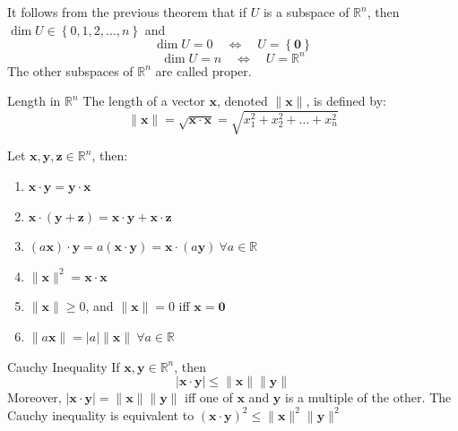 \documentclass[12pt]{article}
\begin{document}
\begin{corollary}{}{}
    It follows from the previous theorem that if $ U $ is a subspace of $ \mathbb{R}^n $, then $ \dim U \in \left\{ 0, 1, 2, \dots, n \right\} $ and
    \[ \dim U = 0 \quad \Longleftrightarrow \quad U = \left\{ \mathbf{0} \right\} \]
    \[ \dim U = n \quad \Longleftrightarrow \quad U = \mathbb{R}^n \]
    The other subspaces of $ \mathbb{R}^n $ are called proper.
\end{corollary}

\begin{definition}{Length in $ \mathbb{R}^n $}{}
    The length of a vector $ \mathbf{x} $, denoted $ \lVert \mathbf{x} \rVert $, is defined by:
    \[ \lVert \mathbf{x} \rVert = \sqrt{\mathbf{x} \cdot \mathbf{x}} = \sqrt{x_1^2 + x_2^2 + \dots + x_n^2 } \]
\end{definition}

\begin{theorem}{}{}
    Let $ \mathbf{x}, \mathbf{y}, \mathbf{z} \in \mathbb{R}^n $, then:
    \begin{enumerate}
        \item $ \mathbf{x} \cdot \mathbf{y} = \mathbf{y} \cdot \mathbf{x} $
        \item $ \mathbf{x} \cdot \left( \mathbf{y} + \mathbf{z} \right) = \mathbf{x} \cdot \mathbf{y} + \mathbf{x} \cdot \mathbf{z} $
        \item $ \left( a \mathbf{x} \right) \cdot \mathbf{y} = a \left( \mathbf{x} \cdot \mathbf{y} \right) = \mathbf{x} \cdot \left( a \mathbf{y} \right) \ \forall a \in \mathbb{R} $
        \item $ \lVert \mathbf{x} \rVert^2 = \mathbf{x} \cdot \mathbf{x} $
        \item $ \lVert \mathbf{x} \rVert \geq 0 $, and $ \lVert \mathbf{x} \rVert = 0 $ iff $ \mathbf{x} = \mathbf{0} $
        \item $ \lVert a \mathbf{x} \rVert = \lvert a \rvert \lVert \mathbf{x} \rVert \ \forall a \in \mathbb{R} $
    \end{enumerate}
\end{theorem}

\begin{theorem}{Cauchy Inequality}{}
    If $ \mathbf{x}, \mathbf{y} \in \mathbb{R}^n $, then
    \[ \lvert \mathbf{x} \cdot \mathbf{y} \rvert \leq \lVert \mathbf{x} \rVert \lVert \mathbf{y} \rVert \]
    Moreover, $ \lvert \mathbf{x} \cdot \mathbf{y} \rvert = \lVert \mathbf{x} \rVert \lVert \mathbf{y} \rVert $ iff one of $ \mathbf{x} $ and $ \mathbf{y} $ is a multiple of the other.
    \medskip
    \newline
    The Cauchy inequality is equivalent to $ \left( \mathbf{x} \cdot \mathbf{y} \right)^2 \leq \lVert \mathbf{x} \rVert^2 \lVert \mathbf{y} \rVert^2 $
\end{theorem}
\end{document}
